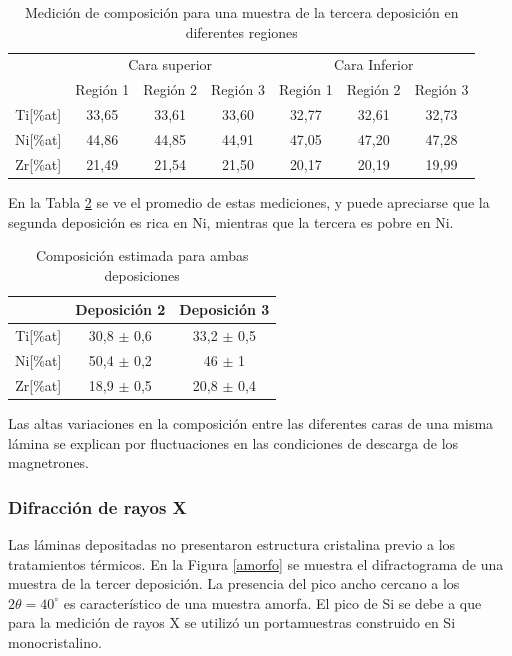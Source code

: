 \documentclass[12pt]{article}
\theoremstyle{definition}
\theoremstyle{remark}
\begin{document}
{\begin{table}[H]
\begin{tabular}{c|c|c|c|c|c|c|}
\cline{2-7}
\multicolumn{1}{l|}{} & \multicolumn{3}{c|}{Cara superior} & \multicolumn{3}{c|}{Cara Inferior} \\ \cline{2-7} 
\multicolumn{1}{l|}{} & Región 1 & Región 2 & Región 3 & Región 1 & Región 2 & Región 3 \\ \hline
\multicolumn{1}{|c|}{Ti{[}\%at{]}} & 33,65 & 33,61 & 33,60 & 32,77 & 32,61 & 32,73 \\ \hline
\multicolumn{1}{|c|}{Ni{[}\%at{]}} & 44,86 & 44,85 & 44,91 & 47,05 & 47,20 & 47,28 \\ \hline
\multicolumn{1}{|c|}{Zr{[}\%at{]}} & 21,49 & 21,54 & 21,50 & 20,17 & 20,19 & 19,99 \\ \hline
\end{tabular}
\caption{Medición de composición para una muestra de la tercera deposición en diferentes regiones}
\label{composition3}
\end{table}

En la Tabla \ref{compositionAvg} se ve el promedio de estas mediciones, y puede apreciarse que la segunda deposición es rica en Ni, mientras que la tercera es pobre en Ni.


\begin{table}[H]
\centering
\begin{tabular}{c|c|c|}
\cline{2-3}
\multicolumn{1}{l|}{} & Deposición 2 & Deposición 3 \\ \hline
\multicolumn{1}{|c|}{Ti{[}\%at{]}} & 30,8 $\pm$ 0,6 & 33,2 $\pm$ 0,5 \\ \hline
\multicolumn{1}{|c|}{Ni{[}\%at{]}} & 50,4 $\pm$ 0,2 & 46 $\pm$ 1 \\ \hline
\multicolumn{1}{|c|}{Zr{[}\%at{]}} & 18,9 $\pm$ 0,5 & 20,8 $\pm$ 0,4 \\ \hline
\end{tabular}
\caption{Composición estimada para ambas deposiciones}
\label{compositionAvg}
\end{table}

Las altas variaciones en la composición entre las diferentes caras de una misma lámina se explican por fluctuaciones en las condiciones de descarga de los magnetrones. 

\subsubsection{Difracción de rayos X}
Las láminas depositadas no presentaron estructura cristalina previo a los tratamientos térmicos. En la Figura \ref{amorfo} se muestra el difractograma de una muestra de la tercer deposición. La presencia del pico ancho cercano a los $2\theta=40^\circ$  es característico de una muestra amorfa. El pico de Si se debe a que para la medición de rayos X se utilizó un portamuestras construido en Si monocristalino.

}
\end{document}
